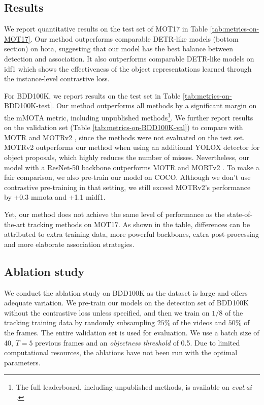 \subsection{Results}

 We report quantitative results on the test set of MOT17 in Table \ref{tab:metrics-on-MOT17}. Our method outperforms comparable DETR-like models (bottom section) on \ac{hota}, suggesting that our model has the best balance between detection and association. It also outperforms comparable DETR-like models on \ac{idf1} which shows the effectiveness of the object representations learned through the instance-level contrastive loss. 

 For BDD100K, we report results on the test set in Table \ref{tab:metrics-on-BDD100K-test}. 
Our method outperforms all methods by a significant margin on the mMOTA metric, including unpublished methods\footnote{The full leaderboard, including unpublished methods, is available on \textit{eval.ai} \cite{evalAI:Online}.}.
We further report results on the validation set (Table \ref{tab:metrics-on-BDD100K-val}) to compare with MOTR \cite{zeng2022motr} and MOTRv2 \cite{Zhang_2023_CVPR}, since the methods were not evaluated on the test set.
MOTRv2 outperforms our method when using an additional YOLOX \cite{ge2021yolox} detector for object proposals, which highly reduces the number of misses.
Nevertheless, our model with a ResNet-50 backbone outperforms MOTR \cite{zeng2022motr} and MORTv2 \cite{Zhang_2023_CVPR}. 
To make a fair comparison, we also pre-train our model on COCO. Although we don't use contrastive pre-training in that setting, we still exceed MOTRv2's performance by +0.3 \ac{mmota} and +1.1 \ac{midf1}. 

 Yet, our method does not achieve the same level of performance as the state-of-the-art tracking methods on MOT17. As shown in the table, differences can be attributed to extra training data, more powerful backbones, extra post-processing and more elaborate association strategies. 

\vspace{-0.2em}

\subsection{Ablation study}

We conduct the ablation study on BDD100K \cite{bdd100k} as the dataset is large and offers adequate variation. We pre-train our models on the detection set of BDD100K without the contrastive loss unless specified, and then we train on $1/8$ of the tracking training data by randomly subsampling $25\%$ of the videos and $50\%$ of the frames. The entire validation set is used for evaluation. We use a batch size of 40, $T=5$ previous frames and an \textit{objectness threshold} of 0.5. Due to limited computational resources, the ablations have not been run with the optimal parameters.

